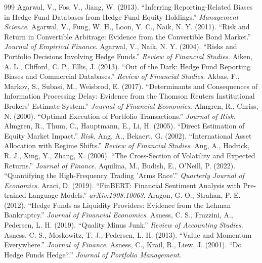 \begin{thebibliography}{999}
\small
\setlength{\itemsep}{0.15em}
 Agarwal, V., Fos, V., Jiang, W. (2013). ``Inferring Reporting-Related Biases in Hedge Fund Databases from Hedge Fund Equity Holdings.'' \textit{Management Science}.
 Agarwal, V., Fung, W. H., Loon, Y. C., Naik, N. Y. (2011). ``Risk and Return in Convertible Arbitrage: Evidence from the Convertible Bond Market.'' \textit{Journal of Empirical Finance}.
 Agarwal, V., Naik, N. Y. (2004). ``Risks and Portfolio Decisions Involving Hedge Funds.'' \textit{Review of Financial Studies}.
 Aiken, A. L., Clifford, C. P., Ellis, J. (2013). ``Out of the Dark: Hedge Fund Reporting Biases and Commercial Databases.'' \textit{Review of Financial Studies}.
 Akbas, F., Markov, S., Subasi, M., Weisbrod, E. (2017). ``Determinants and Consequences of Information Processing Delay: Evidence from the Thomson Reuters Institutional Brokers' Estimate System.'' \textit{Journal of Financial Economics}.
 Almgren, R., Chriss, N. (2000). ``Optimal Execution of Portfolio Transactions.'' \textit{Journal of Risk}.
 Almgren, R., Thum, C., Hauptmann, E., Li, H. (2005). ``Direct Estimation of Equity Market Impact.'' \textit{Risk}.
 Ang, A., Bekaert, G. (2002). ``International Asset Allocation with Regime Shifts.'' \textit{Review of Financial Studies}.
 Ang, A., Hodrick, R. J., Xing, Y., Zhang, X. (2006). ``The Cross-Section of Volatility and Expected Returns.'' \textit{Journal of Finance}.
 Aquilina, M., Budish, E., O'Neill, P. (2022). ``Quantifying the High-Frequency Trading 'Arms Race'.'' \textit{Quarterly Journal of Economics}.
 Araci, D. (2019). ``FinBERT: Financial Sentiment Analysis with Pre-trained Language Models.'' \textit{arXiv:1908.10063}.
 Aragon, G. O., Strahan, P. E. (2012). ``Hedge Funds as Liquidity Providers: Evidence from the Lehman Bankruptcy.'' \textit{Journal of Financial Economics}.
 Asness, C. S., Frazzini, A., Pedersen, L. H. (2019). ``Quality Minus Junk.'' \textit{Review of Accounting Studies}.
 Asness, C. S., Moskowitz, T. J., Pedersen, L. H. (2013). ``Value and Momentum Everywhere.'' \textit{Journal of Finance}.
 Asness, C., Krail, R., Liew, J. (2001). ``Do Hedge Funds Hedge?.'' \textit{Journal of Portfolio Management}.

\end{thebibliography}

